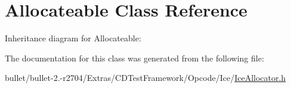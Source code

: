 \hypertarget{class_allocateable}{\section{Allocateable Class Reference}
\label{class_allocateable}
}


Inheritance diagram for Allocateable\+:


The documentation for this class was generated from the following file\+:\begin{DoxyCompactItemize}
\item 
bullet/bullet-\/2.-\/r2704/\+Extras/\+C\+D\+Test\+Framework/\+Opcode/\+Ice/\hyperlink{_ice_allocator_8h}{Ice\+Allocator.\+h}\end{DoxyCompactItemize}
